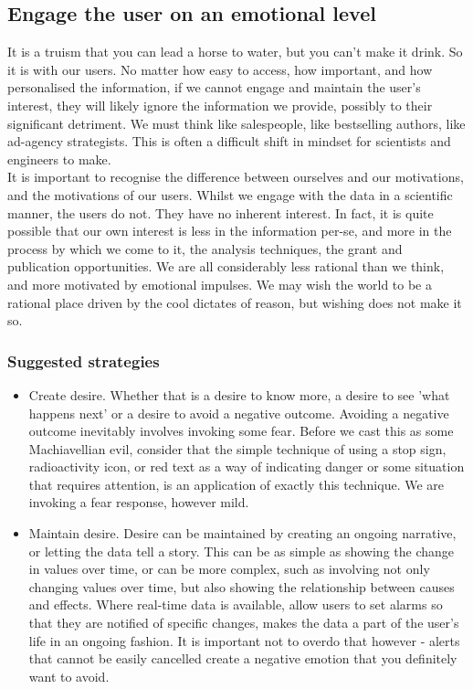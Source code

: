 \subsection{Engage the user on an emotional level}

It is a truism that you can lead a horse to water, but you can't make it drink. So it is with our users.
No matter how easy to access, how important, and how personalised the information, if we cannot engage and maintain the user's interest,
they will likely ignore the information we provide, possibly to their significant detriment.
We must think like salespeople, like bestselling authors, like ad-agency strategists.
This is often a difficult shift in mindset for scientists and engineers to make.\\

It is important to recognise the difference between ourselves and our motivations, and the motivations of our users. Whilst we engage with the data in a scientific
manner, the users do not. They have no inherent interest. In fact, it is quite possible that our own interest is less in the information per-se, and more in the process
by which we come to it, the analysis techniques, the grant and publication opportunities. We are all considerably less rational than we think, and more motivated by
emotional impulses. We may wish the world to be a rational place driven by the cool dictates of reason, but wishing does not make it so. \\

\subsubsection*{Suggested strategies}

\begin{itemize}

    \item Create desire. Whether that is a desire to know more, a desire to see 'what happens next' or a desire to avoid a negative outcome.
    Avoiding a negative outcome inevitably involves invoking some fear. Before we cast this as some Machiavellian evil, consider that the simple
    technique of using a stop sign, radioactivity icon, or red text as a way of indicating danger or some situation that requires attention, is an
    application of exactly this technique. We are invoking a fear response, however mild.

    \item Maintain desire. Desire can be maintained by creating an ongoing narrative, or letting the data tell a story. This can be as simple as showing the change in 
    values over time, or can be more complex, such as involving not only changing values over time, but also showing the relationship between causes and
    effects. Where real-time data is available, allow users to set alarms so that they are notified of specific changes, makes the data a part of the user's
    life in an ongoing fashion. It is important not to overdo that however - alerts that cannot be easily cancelled create a negative emotion that you
    definitely want to avoid.

\end{itemize}

